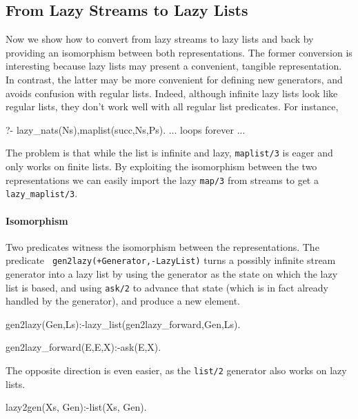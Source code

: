 \documentclass[submission,copyright,creativecommons]{eptcs}
\begin{document}

\subsection{From Lazy Streams to Lazy Lists}

Now we show how to convert from lazy streams to lazy lists and back by
providing an isomorphism between both representations.
The former conversion is interesting because lazy lists may present a convenient, tangible 
representation. In contrast, the latter may be more convenient for defining new
generators, and avoids confusion with regular lists.
Indeed, although infinite lazy lists look like regular lists, they don't work
well with all regular list predicates. For instance,
\begin{codex}
?- lazy_nats(Ns),maplist(succ,Ns,Ps).
... loops forever ...
\end{codex}
The problem is that while the list is infinite and lazy, {\tt maplist/3} is eager
and only works on finite lists.
By exploiting the isomorphism between the two representations we can easily import the lazy {\tt map/3} from
streams to get a {\tt lazy\_maplist/3}.

\paragraph{Isomorphism} Two predicates witness the isomorphism between the
representations. The predicate {\tt
gen2lazy(+Generator,-LazyList)} turns a possibly infinite stream generator into
a lazy list by using the generator as the state on which the lazy list is
based, and using \texttt{ask/2} to advance that state (which is in fact already
handled by the generator), and produce a new element.
\begin{code} 
gen2lazy(Gen,Ls):-lazy_list(gen2lazy_forward,Gen,Ls).

gen2lazy_forward(E,E,X):-ask(E,X).
\end{code}
The opposite direction is even easier, as the {\tt list/2} generator also works
on lazy lists.
\begin{code}
lazy2gen(Xs, Gen):-list(Xs, Gen).
\end{code}
\end{document}
